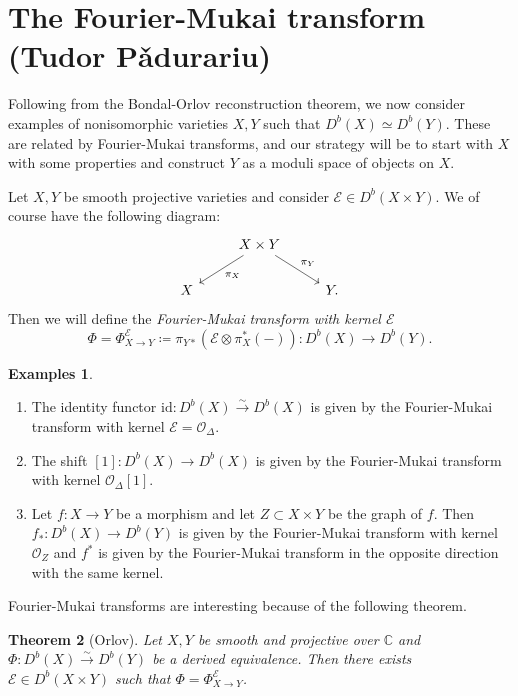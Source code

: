 \documentclass{amsart}
\newtheorem{thm}{Theorem}[section]
\theoremstyle{definition}
\newtheorem{exms}[thm]{Examples}
\theoremstyle{remark}
\theoremstyle{plain}
\theoremstyle{definition}
\theoremstyle{remark}
\newcommand{\C}{\mathbb{C}}
\newcommand{\mc}[1]{\mathcal{#1}}
\newcommand{\mr}[1]{\mathrm{#1}}
\newcommand{\1}{\mathbf{1}}
\newcommand{\2}{\mathbf{2}}
\newcommand{\3}{\mathbf{3}}
\begin{document}
\section{The Fourier-Mukai transform (Tudor P\v{a}durariu)}

Following from the Bondal-Orlov reconstruction theorem, we now consider examples of nonisomorphic varieties $X, Y$ such that $D^b(X) \simeq D^b(Y)$. These are related by Fourier-Mukai transforms, and our strategy will be to start with $X$ with some properties and construct $Y$ as a moduli space of objects on $X$.

Let $X, Y$ be smooth projective varieties and consider $\mc{E} \in D^b(X \times Y)$. We of course have the following diagram:
\begin{equation*}
\begin{tikzcd}
    & X \times Y \ar{dl}{\pi_X} \ar{dr}{\pi_Y} \\
    X & & Y.
\end{tikzcd}
\end{equation*}
Then we will define the \textit{Fourier-Mukai transform with kernel $\mc{E}$}
\[ \Phi = \Phi^{\mc{E}}_{X \to Y} \coloneqq \pi_{Y*} (\mc{E} \otimes \pi_X^*(-)) \colon D^b(X) \to D^b(Y). \]

\begin{exms}\leavevmode
    \begin{enumerate}
        \item The identity functor $\mr{id} \colon D^b(X) \xrightarrow{\sim} D^b(X)$ is given by the Fourier-Mukai transform with kernel $\mc{E} = \mc{O}_{\Delta}$.
        \item The shift $[1] \colon D^b(X) \to D^b(X)$ is given by the Fourier-Mukai transform with kernel $\mc{O}_{\Delta}[1]$.
        \item Let $f \colon X \to Y$ be a morphism and let $Z \subset X \times Y$ be the graph of $f$. Then $f_* \colon D^b(X) \to D^b(Y)$ is given by the Fourier-Mukai transform with kernel $\mc{O}_Z$ and $f^*$ is given by the Fourier-Mukai transform in the opposite direction with the same kernel.
    \end{enumerate}
\end{exms}

Fourier-Mukai transforms are interesting because of the following theorem.
\begin{thm}[Orlov]
    Let $X, Y$ be smooth and projective over $\C$ and $\Phi \colon D^b(X) \xrightarrow{\sim} D^b(Y)$ be a derived equivalence. Then there exists $\mc{E} \in D^b(X \times Y)$ such that $\Phi = \Phi_{X \to Y}^{\mc{E}}$.
\end{thm}
\end{document}

